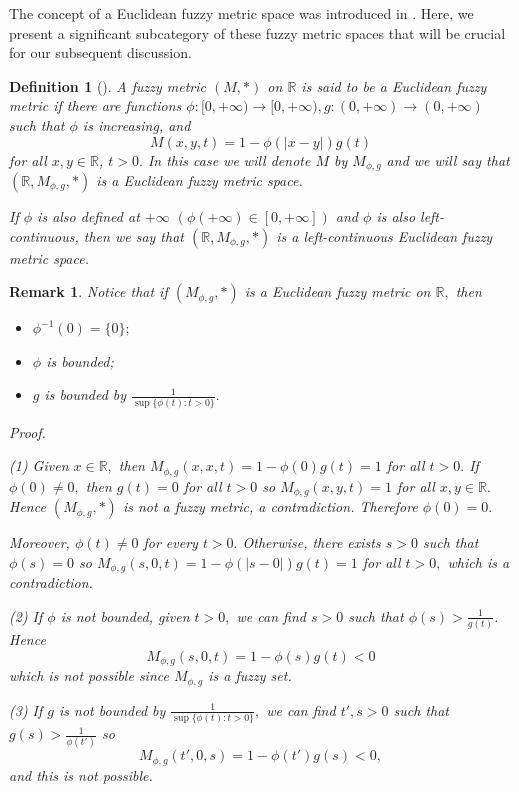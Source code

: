 \documentclass[12pt]{amsart}
\newtheorem{remark}[theorem]{Remark}
\newtheorem{definition}[theorem]{Definition}
\begin{document}
		
		
	\date{}
	\maketitle
		
		

	
	
	
	
	
	The concept of a Euclidean fuzzy metric space was introduced in \cite{JFRLSP21}. Here, we present a significant subcategory of these fuzzy metric spaces that will be crucial for our subsequent discussion.
	
	
	\begin{definition}[\cite{JFRLSP21}]
		A fuzzy metric $(M,\ast)$ on $\mathbb{R}$ is said to be a \emph{Euclidean fuzzy metric} if there are  functions  $\phi:[0,+\infty) \to [0,+\infty), g:(0,+\infty)\to (0,+\infty)$ such that
		$\phi$ is increasing, and
		$$
		M(x,y,t)=1- \phi(|x-y|) g(t)
		$$
		for all $x,y\in \mathbb{R}$, $t>0.$
		In this case we will denote $M$ by $M_{\phi,g}$  and we will say that $(\mathbb{R},M_{\phi,g},\ast)$ is a Euclidean fuzzy metric space.
		
		If $\phi$ is also defined at $+\infty$ $(\phi(+\infty)\in [0,+\infty])$ and $\phi$ is also left-continuous, then we say that $(\mathbb{R},M_{\phi,g},\ast)$ is a left-continuous Euclidean fuzzy metric space.
	\end{definition}
	
	\begin{remark}\label{rem1}
		Notice that if $(M_{\phi,g},\ast)$ is a Euclidean fuzzy metric on $\mathbb{R},$ then
		\begin{itemize}
			\item[(1)] $\phi^{-1}(0)=\{0\};$
			\item[(2)] $\phi$ is bounded{\rm ;}
			\item[(3)] $g$ is bounded by $\frac{1}{\sup\{\phi(t):t>0\}}.$
		\end{itemize}  Proof. 
		
		\noindent (1) Given $x\in \mathbb{R},$ then $M_{\phi,g}(x,x,t)=1-\phi(0)g(t)=1$ for all $t>0.$ If $\phi(0)\neq 0,$ then $g(t)=0$ for all $t>0$ so $M_{\phi,g}(x,y,t)=1$ for all $x,y\in \mathbb{R}.$ Hence $(M_{\phi,g},\ast)$ is not a fuzzy metric, a contradiction. Therefore $\phi(0)=0.$ 
		
		Moreover, $\phi(t)\neq 0$ for every $t>0.$  Otherwise, there exists $s>0$ such that $\phi(s)=0$ so $M_{\phi,g}(s,0,t)=1-\phi(|s-0|)g(t)=1$ for all $t>0,$ which is a contradiction. 
		
		\noindent (2) If $\phi$ is not bounded, given $t>0,$ we can find $s>0$ such that $\phi(s)>\frac{1}{g(t)}$. Hence
		$$M_{\phi,g}(s,0,t)=1-\phi(s)g(t)<0$$
		which is not possible since $M_{\phi,g}$ is a fuzzy set.	
		
		\noindent (3)  If $g$ is not bounded by $\frac{1}{\sup\{\phi(t):t>0\}},$ we can find $t',s>0$ such that $g(s)>\frac{1}{\phi(t')}$ so
		$$M_{\phi,g}(t',0,s)=1-\phi(t')g(s)<0,$$
		and this is not possible.
		
		
		
		
	\end{remark}
	
\end{document}
